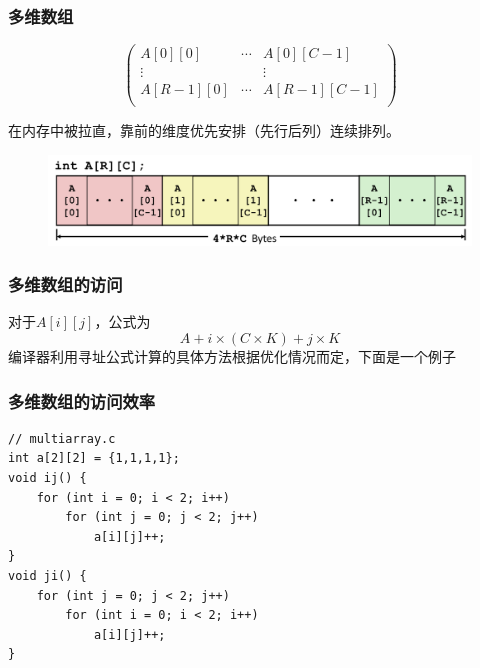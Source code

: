 \documentclass[12pt,AutoFakeBold,aspectratio=169,mathserif]{beamer}
\begin{document}
    \begin{frame}
        \frametitle{多维数组}
    
        \[\left(
            \begin{matrix}
            A[0][0]&\cdots&A[0][C-1]\\
            \vdots&&\vdots\\
            A[R-1][0]&\cdots&A[R-1][C-1]\\
        \end{matrix}
        \right)\]

        在内存中被拉直，靠前的维度优先安排（先行后列）连续排列。
        \begin{figure}
            \includegraphics[width=\textwidth]{figures/multiarray.png}
        \end{figure}
    
    \end{frame}

    \begin{frame}
        \frametitle{多维数组的访问}
    
        对于\(A[i][j]\)，公式为
        \[A+i\times (C\times K)+j\times K\]
        编译器利用寻址公式计算的具体方法根据优化情况而定，下面是一个例子
    \end{frame}

    \begin{frame}[fragile]
        \frametitle{多维数组的访问效率}
    
        \begin{lstlisting}
// multiarray.c
int a[2][2] = {1,1,1,1};
void ij() {
    for (int i = 0; i < 2; i++)
        for (int j = 0; j < 2; j++)
            a[i][j]++;
}
void ji() {
    for (int j = 0; j < 2; j++)
        for (int i = 0; i < 2; i++)
            a[i][j]++;
}
        \end{lstlisting}
    
    \end{frame}
\end{document}
